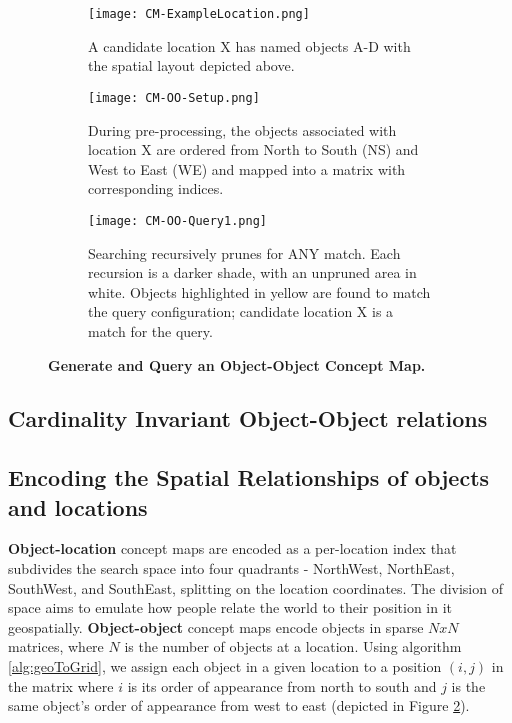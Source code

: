 

\begin{figure*}[h]
    \centering
    \begin{subfigure}[t]{.25\textwidth}
        \texttt{[image: CM-ExampleLocation.png]}
        \caption{\small A candidate location X has named objects A-D with the spatial layout depicted above.}
        \label{fig:CM-Example}
    \end{subfigure}
    \hfill
    \begin{subfigure}[t]{.25\textwidth}
        \texttt{[image: CM-OO-Setup.png]}
        \caption{\small During pre-processing, the objects associated with location X are ordered from North to South (NS) and West to East (WE) and mapped into a matrix with corresponding indices.}
        \label{fig:CM-OO-Setup}
    \end{subfigure}
    \hfill
        \begin{subfigure}[t]{.25\textwidth}
        \texttt{[image: CM-OO-Query1.png]}
        \caption{\small Searching recursively prunes for ANY match. Each recursion is a darker shade, with an unpruned area in white. Objects highlighted in yellow are found to match the query configuration; candidate location X is a match for the query.}
        \label{fig:CM-OO-Query}
    \hfill
    \end{subfigure}
    \caption{\textbf{Generate and Query an Object-Object Concept Map.}}\label{figure:ConceptMap} 
\end{figure*}

\subsection{Cardinality Invariant Object-Object relations}


\subsection{Encoding the Spatial Relationships of objects and locations}

\textbf{Object-location} concept maps are encoded as a per-location index that subdivides the search space into four quadrants - NorthWest, NorthEast, SouthWest, and SouthEast, splitting on the location coordinates. The division of space aims to emulate how people relate the world to their position in it geospatially. 
\textbf{Object-object} concept maps encode objects in sparse $NxN$ matrices, where $N$ is the number of objects at a location. 
Using algorithm \ref{alg:geoToGrid}, we assign each object in a given location to a position $(i,j)$ in the matrix where $i$ is its order of appearance from north to south and $j$ is the same object's order of appearance from west to east (depicted in Figure \ref{fig:CM-OO-Setup}). 


